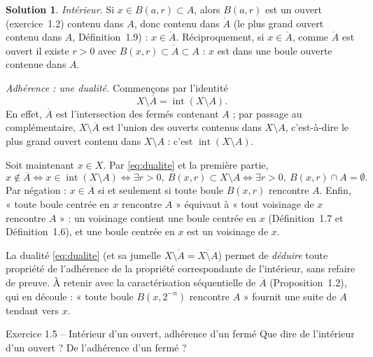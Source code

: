 \documentclass[11pt,a4paper]{article}
\newcommand{\interieur}[1]{\mathring{#1}}
\newcommand{\adh}[1]{\overline{#1}}
\newcommand{\Int}{\operatorname{int}}
\newcommand{\ie}{c'est-à-dire}
\theoremstyle{definition}
\newtheorem*{solution}{Solution}
\begin{document}
\begin{solution}
\emph{Intérieur.} Si $x\in B(a,r)\subset A$, alors $B(a,r)$ est un ouvert (exercice~1.2) contenu dans $A$, donc contenu dans $\interieur A$ (le plus grand ouvert contenu dans $A$, Définition~1.9) : $x\in\interieur A$. Réciproquement, si $x\in\interieur A$, comme $\interieur A$ est ouvert il existe $r>0$ avec $B(x,r)\subset\interieur A\subset A$ : $x$ est dans une boule ouverte contenue dans $A$.

\emph{Adhérence : une dualité.} Commençons par l'identité
\begin{equation}\label{eq:dualite}
X\setminus\adh A=\Int(X\setminus A).
\end{equation}
En effet, $\adh A$ est l'intersection des fermés contenant $A$ ; par passage au complémentaire, $X\setminus\adh A$ est l'union des ouverts contenus dans $X\setminus A$, \ie{} le plus grand ouvert contenu dans $X\setminus A$ : c'est $\Int(X\setminus A)$.

Soit maintenant $x\in X$. Par \eqref{eq:dualite} et la première partie,
\[
x\notin\adh A\iff x\in\Int(X\setminus A)\iff\exists r>0,\ B(x,r)\subset X\setminus A\iff\exists r>0,\ B(x,r)\cap A=\emptyset .
\]
Par négation : $x\in\adh A$ si et seulement si toute boule $B(x,r)$ rencontre $A$. Enfin, « toute boule centrée en $x$ rencontre $A$ » équivaut à « tout voisinage de $x$ rencontre $A$ » : un voisinage contient une boule centrée en $x$ (Définition~1.7 et Définition~1.6), et une boule centrée en $x$ est un voisinage de $x$.
\end{solution}

\begin{pointcle}
La dualité \eqref{eq:dualite} (et sa jumelle $X\setminus\interieur A=\adh{X\setminus A}$) permet de \emph{déduire} toute propriété de l'adhérence de la propriété correspondante de l'intérieur, sans refaire de preuve. À retenir avec la caractérisation séquentielle de $\adh A$ (Proposition~1.2), qui en découle : « toute boule $B(x,2^{-n})$ rencontre $A$ » fournit une suite de $A$ tendant vers $x$.
\end{pointcle}

\begin{exo}{Exercice 1.5 -- Intérieur d'un ouvert, adhérence d'un fermé}
Que dire de l'intérieur d'un ouvert ? De l'adhérence d'un fermé ?
\end{exo}
\end{document}
